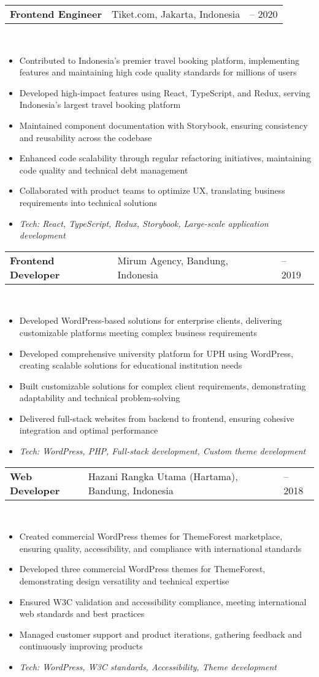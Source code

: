 \documentclass[a4paper, 11pt]{article}
\newcommand{\resumeItem}[1]{
  \item\small{
    {#1 \vspace{-2pt}}
  }
}
\newcommand{\resumeSubheading}[4]{
  \vspace{-2pt}\item
    \begin{tabularx}{0.987\textwidth}[t]{
  >{\raggedright\arraybackslash}X
  >{\centering\arraybackslash}X
  >{\raggedleft\arraybackslash}X }
      \textbf{#1} & #2 & #3 \\
    \end{tabularx}
    \textit{\small#4}\\
    \vspace{-7pt}
}
\newcommand{\resumeItemListStart}{\begin{itemize}[leftmargin=0.22in]}
\newcommand{\resumeItemListEnd}{\end{itemize}\vspace{-20pt}}
\begin{document}
        \resumeSubheading
            {Frontend Engineer}{Tiket.com, Jakarta, Indonesia}{2019 -- 2020}{}
            \resumeItemListStart
                \resumeItem{Contributed to Indonesia's premier travel booking platform, implementing features and maintaining high code quality standards for millions of users}
                \resumeItem{Developed high-impact features using React, TypeScript, and Redux, serving Indonesia's largest travel booking platform}
                \resumeItem{Maintained component documentation with Storybook, ensuring consistency and reusability across the codebase}
                \resumeItem{Enhanced code scalability through regular refactoring initiatives, maintaining code quality and technical debt management}
                \resumeItem{Collaborated with product teams to optimize UX, translating business requirements into technical solutions}
                \resumeItem{\textit{Tech: React, TypeScript, Redux, Storybook, Large-scale application development}}
            \resumeItemListEnd

        \resumeSubheading
            {Frontend Developer}{Mirum Agency, Bandung, Indonesia}{2018 -- 2019}{}
            \resumeItemListStart
                \resumeItem{Developed WordPress-based solutions for enterprise clients, delivering customizable platforms meeting complex business requirements}
                \resumeItem{Developed comprehensive university platform for UPH using WordPress, creating scalable solutions for educational institution needs}
                \resumeItem{Built customizable solutions for complex client requirements, demonstrating adaptability and technical problem-solving}
                \resumeItem{Delivered full-stack websites from backend to frontend, ensuring cohesive integration and optimal performance}
                \resumeItem{\textit{Tech: WordPress, PHP, Full-stack development, Custom theme development}}
            \resumeItemListEnd

        \resumeSubheading
            {Web Developer}{Hazani Rangka Utama (Hartama), Bandung, Indonesia}{2017 -- 2018}{}
            \resumeItemListStart
                \resumeItem{Created commercial WordPress themes for ThemeForest marketplace, ensuring quality, accessibility, and compliance with international standards}
                \resumeItem{Developed three commercial WordPress themes for ThemeForest, demonstrating design versatility and technical expertise}
                \resumeItem{Ensured W3C validation and accessibility compliance, meeting international web standards and best practices}
                \resumeItem{Managed customer support and product iterations, gathering feedback and continuously improving products}
                \resumeItem{\textit{Tech: WordPress, W3C standards, Accessibility, Theme development}}
            \resumeItemListEnd
\end{document}

